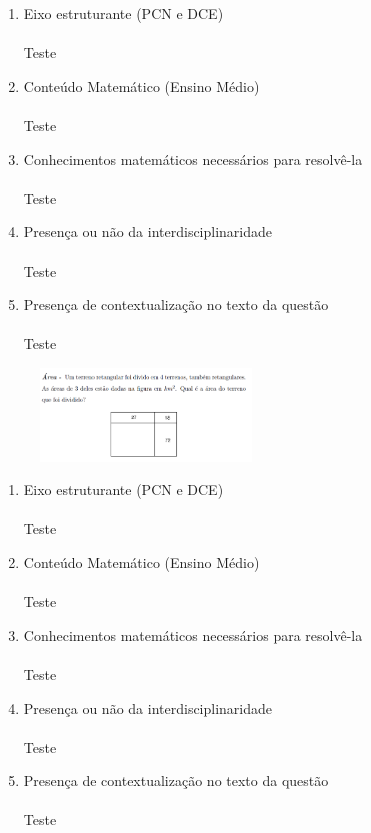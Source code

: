 \documentclass[a4paper, 12pt]{article}
\begin{document}
\begin{enumerate}
\begin{figure}[h!]
\end{figure} 
  \begin{enumerate}
  \item Eixo estruturante (PCN e DCE)\\\\
    Teste
  \item Conteúdo Matemático (Ensino Médio) \\\\
    Teste
  \item Conhecimentos matemáticos necessários para resolvê-la \\\\
    Teste
  \item Presença ou não da interdisciplinaridade \\\\
    Teste
  \item Presença de contextualização no texto da questão\\\\
    Teste
  \end{enumerate}
\begin{figure}[h!]
  \centering
  \includegraphics[width=0.5\textwidth]{3}
\end{figure} 
  \begin{enumerate}
  \item Eixo estruturante (PCN e DCE)\\\\
    Teste
  \item Conteúdo Matemático (Ensino Médio) \\\\
    Teste
  \item Conhecimentos matemáticos necessários para resolvê-la \\\\
    Teste
  \item Presença ou não da interdisciplinaridade \\\\
    Teste
  \item Presença de contextualização no texto da questão\\\\
    Teste
  \end{enumerate}
\end{enumerate}
\end{document}
